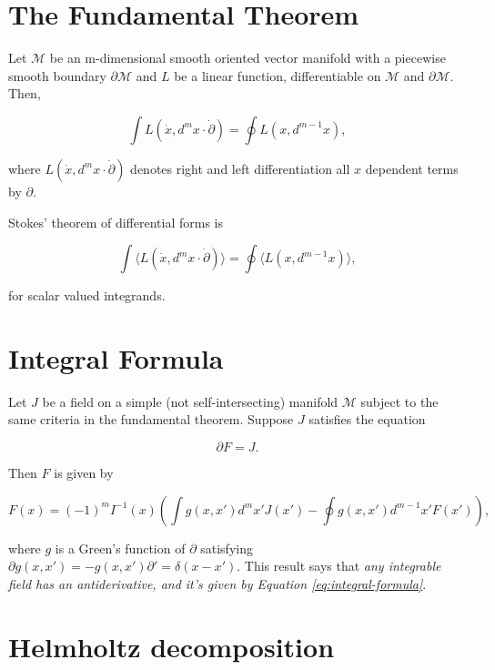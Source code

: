 \documentclass{article}
\begin{document}
\section{The Fundamental Theorem}

Let $\mathcal{M}$ be an m-dimensional smooth oriented vector manifold with a piecewise smooth boundary $\partial \mathcal{M}$ and $L$ be a linear function, differentiable on $\mathcal{M}$ and $\partial \mathcal{M}$. Then, \cite{cagc}

\begin{equation}
  \int L(\dot x, d^mx \cdot \dot \partial) = \oint L(x, d^{m-1}x),\label{eq:fundamental-theorem}
\end{equation}

where $L(\dot x, d^mx \cdot \dot \partial)$ denotes right and left differentiation all $x$ dependent terms by $\partial$.

Stokes' theorem of differential forms is

\begin{equation}
  \int \langle L(\dot x, d^mx \cdot \dot \partial)\rangle = \oint \langle L(x, d^{m-1}x)\rangle,
\end{equation}

for scalar valued integrands.

\section{Integral Formula}

Let $J$ be a field on a simple (not self-intersecting) manifold $\mathcal{M}$ subject to the same criteria in the fundamental theorem. Suppose $J$ satisfies the equation

\begin{equation}
  \partial F = J.
\end{equation}

Then $F$ is given by \cite{cagc}

\begin{equation}
  F(x) = (-1)^m I^{-1}(x) \left(\int g(x, x') d^{m}x' J(x') - \oint g(x, x') d^{m-1}x' F(x')\right),\label{eq:integral-formula}
\end{equation}

where $g$ is a Green's function of $\partial$ satisfying $\partial g(x,x') = - g(x, x') \partial' = \delta(x - x').$ This result says that \emph{any integrable field has an antiderivative, and it's given by Equation \ref{eq:integral-formula}}.

\section{Helmholtz decomposition}
\end{document}
